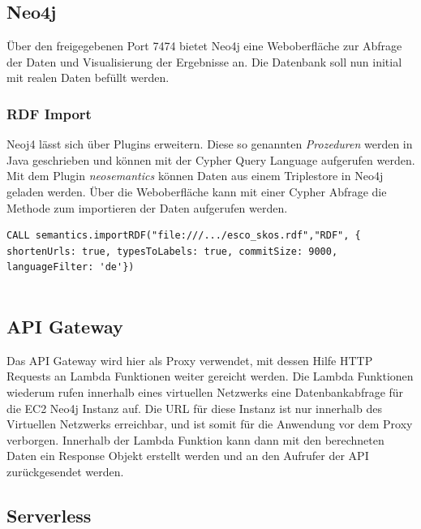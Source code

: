 \subsection{Neo4j}

Über den freigegebenen Port 7474 bietet Neo4j eine Weboberfläche zur Abfrage der Daten und Visualisierung der Ergebnisse an. Die Datenbank soll nun initial mit realen Daten befüllt werden. 

\subsubsection{RDF Import}

Neoj4 lässt sich über Plugins erweitern. Diese so genannten \textit{Prozeduren} werden in Java geschrieben und können mit der Cypher Query Language aufgerufen werden.
Mit dem Plugin \textit{neosemantics} können Daten aus einem Triplestore in Neo4j geladen werden. Über die Weboberfläche kann mit einer Cypher Abfrage die Methode zum importieren der Daten aufgerufen werden. 

\lstset{language=xml}
\lstset{language=java}
\lstset{breaklines=true}
\begin{lstlisting}[frame=htrbl, caption={importRDF Prozeduraufruf}, label={lst:importRDF}]
CALL semantics.importRDF("file:///.../esco_skos.rdf","RDF", { shortenUrls: true, typesToLabels: true, commitSize: 9000, languageFilter: 'de'})


\end{lstlisting}




\subsection{API Gateway}

Das API Gateway wird hier als Proxy verwendet, mit dessen Hilfe HTTP Requests an Lambda Funktionen weiter gereicht werden. Die Lambda Funktionen wiederum rufen innerhalb eines virtuellen Netzwerks eine Datenbankabfrage für die EC2 Neo4j Instanz auf. Die URL für diese Instanz ist nur innerhalb des Virtuellen Netzwerks erreichbar, und ist somit für die Anwendung vor dem Proxy verborgen. Innerhalb der Lambda Funktion kann dann mit den berechneten Daten ein Response Objekt erstellt werden und an den Aufrufer der API zurückgesendet werden. 

\subsection{Serverless}

